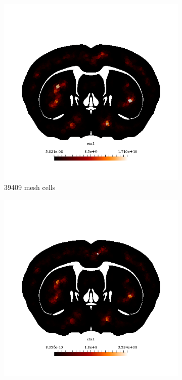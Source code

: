 \begin{figure}[h!]
  \centering
  \begin{subfigure}[b]{0.49\textwidth}
    \includegraphics[width=\textwidth,height=\textheight,keepaspectratio,height=\textheight,keepaspectratio]{figures/4_mpet/biomedical/space/eta1_1.png}
    \caption{39409 mesh cells}
  \end{subfigure}
  \begin{subfigure}[b]{0.49\textwidth}
    \includegraphics[width=\textwidth,height=\textheight,keepaspectratio,height=\textheight,keepaspectratio]{figures/4_mpet/biomedical/space/eta1_2.png}

\end{subfigure}
\end{figure}
